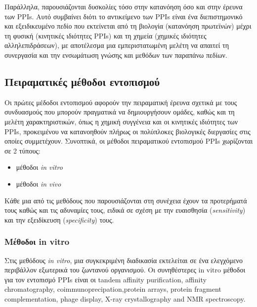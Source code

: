 \medskip
Παράλληλα, παρουσιάζονται δυσκολίες τόσο στην κατανόηση όσο και στην έρευνα των PPIs. Αυτό συμβαίνει διότι το αντικείμενο των PPIs είναι ένα διεπιστημονικό και εξειδικευμένο πεδίο που εκτείνεται από τη βιολογία (κατανόηση πρωτεϊνών) μέχρι τη φυσική (κινητικές ιδιότητες PPIs) και τη χημεία (χημικές ιδιότητες αλληλεπιδράσεων), με αποτέλεσμα μια εμπεριστατωμένη μελέτη να απαιτεί τη συνεργασία και την ενσωμάτωση γνώσης και μεθόδων των παραπάνω πεδίων. 

\subsection{Πειραματικές μέθοδοι εντοπισμού}

Οι πρώτες μέδοδοι εντοπισμού αφορούν την πειραματική έρευνα σχετικά με τους συνδυασμούς που μπορούν πραγματικά να δημιουργήσουν ομάδες, καθώς και τη μελέτη χαρακτηριστικών, όπως η χημική συγγένεια και οι κινητικές ιδιότητες των PPIs, προκειμένου να κατανοηθούν πλήρως οι πολύπλοκες βιολογικές διεργασίες στις οποίες συμμετέχουν.
Συνοπτικά, οι μέθοδοι πειραματικού εντοπισμού PPIs χωρίζονται σε 2 τύπους:

\begin{itemize}
    \item μέθοδοι \textit{in vitro}
    \item μέθοδοι \textit{in vivo} 
\end{itemize}

Κάθε μια από τις μεθόδους που παρουσιάζονται στη συνέχεια έχουν τα προτερήματά τους καθώς και τις αδυναμίες τους, ειδικά σε σχέση με την ευαισθησία (\textit{sensitivity}) και την εξειδίκευση (\textit{specificity}) τους.


\subsubsection{Μέθοδοι in vitro}

Στις μεθόδους \textit{in vitro}, μια συγκεκριμένη διαδικασία εκτελείται σε ένα ελεγχόμενο περιβάλλον εξωτερικά του ζωντανού οργανισμού. Οι συνηθέστερες in vitro μέθοδοι για τον εντοπισμό PPIs είναι οι tandem affinity purification, affinity chromatography, coimmunoprecipation,protein arrays, protein fragment complementation, phage display, X-ray crystallography and NMR spectroscopy.

